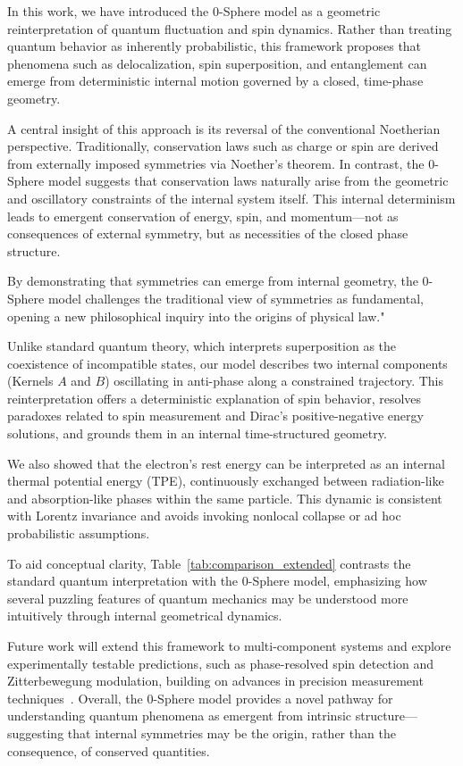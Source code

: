 \documentclass[%
 reprint,
 amsmath,amssymb,
 aps,
]{revtex4-1}
\numberwithin{equation}{section}%
\begin{document}
In this work, we have introduced the 0-Sphere model as a geometric reinterpretation of quantum fluctuation and spin dynamics. Rather than treating quantum behavior as inherently probabilistic, this framework proposes that phenomena such as delocalization, spin superposition, and entanglement can emerge from deterministic internal motion governed by a closed, time-phase geometry.

A central insight of this approach is its reversal of the conventional Noetherian perspective. Traditionally, conservation laws such as charge or spin are derived from externally imposed symmetries via Noether’s theorem. In contrast, the 0-Sphere model suggests that conservation laws naturally arise from the geometric and oscillatory constraints of the internal system itself. This internal determinism leads to emergent conservation of energy, spin, and momentum—not as consequences of external symmetry, but as necessities of the closed phase structure.

By demonstrating that symmetries can emerge from internal geometry, the 0-Sphere model challenges the traditional view of symmetries as fundamental, opening a new philosophical inquiry into the origins of physical law."

Unlike standard quantum theory, which interprets superposition as the coexistence of incompatible states, our model describes two internal components (Kernels $A$ and $B$) oscillating in anti-phase along a constrained trajectory. This reinterpretation offers a deterministic explanation of spin behavior, resolves paradoxes related to spin measurement and Dirac’s positive-negative energy solutions, and grounds them in an internal time-structured geometry.

We also showed that the electron’s rest energy can be interpreted as an internal thermal potential energy (TPE), continuously exchanged between radiation-like and absorption-like phases within the same particle. This dynamic is consistent with Lorentz invariance and avoids invoking nonlocal collapse or ad hoc probabilistic assumptions.

To aid conceptual clarity, Table~\ref{tab:comparison_extended} contrasts the standard quantum interpretation with the 0-Sphere model, emphasizing how several puzzling features of quantum mechanics may be understood more intuitively through internal geometrical dynamics.

Future work will extend this framework to multi-component systems and explore experimentally testable predictions, such as phase-resolved spin detection and Zitterbewegung modulation, building on advances in precision measurement techniques~\cite{gabrielse2013, fan2023}. Overall, the 0-Sphere model provides a novel pathway for understanding quantum phenomena as emergent from intrinsic structure—suggesting that internal symmetries may be the origin, rather than the consequence, of conserved quantities.
\end{document}
